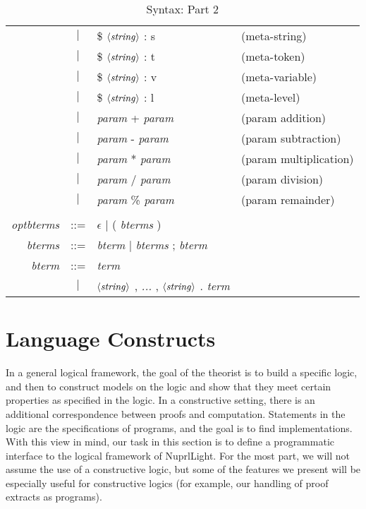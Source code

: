 \documentclass{article}
\newcommand\NuprlLight{NuprlLight}
\begin{document}
\begin{table}[ht]
\begin{center}
{\begin{tabular}{|rcll|}
            & $|$ & \$ $\left<{\it string}\right>$ \hbox{:} s & {\rm (meta-string)}\\
            & $|$ & \$ $\left<{\it string}\right>$ \hbox{:} t & {\rm (meta-token)}\\
            & $|$ & \$ $\left<{\it string}\right>$ \hbox{:} v & {\rm (meta-variable)}\\
            & $|$ & \$ $\left <{\it string}\right>$ \hbox{:} l & {\rm (meta-level)}\\
            & $|$ & {\it param} + {\it param} & {\rm (param addition)}\\
            & $|$ & {\it param} - {\it param} & {\rm (param subtraction)}\\
            & $|$ & {\it param} * {\it param} & {\rm (param multiplication)}\\
            & $|$ & {\it param} / {\it param} & {\rm (param division)}\\
            & $|$ & {\it param} \% {\it param} & {\rm (param remainder)}\\
      &&&\\
      {\it optbterms} & {\rm ::=} & \multicolumn{2}{l|}{$\epsilon$ | ( {\it bterms} )}\\
      {\it bterms} & {\rm ::=} & \multicolumn{2}{l|}{{\it bterm} | {\it bterms} ; {\it bterm}}\\
      {\it bterm} & {\rm ::=} & {\it term} &\\
            & $|$ & $\left<{\it string}\right>$ , {\it ...} , $\left<{\it string}\right>$ . {\it term} &\\
      \hline
    \end{tabular}}
\end{center}
\caption{\label{table:syntax2}Syntax: Part 2}
\end{table}

\section{Language Constructs}

In a general logical framework, the goal of the theorist is to build a specific logic, and then to
construct models on the logic and show that they meet certain properties as specified in the
logic.  In a constructive setting, there is an additional correspondence between proofs and
computation.  Statements in the logic are the specifications of programs, and the goal is to find
implementations.  With this view in mind, our task in this section is to define a programmatic
interface to the logical framework of \NuprlLight{}.  For the most part, we will not assume the use
of a constructive logic, but some of the features we present will be especially useful for
constructive logics (for example, our handling of proof extracts as programs).
\end{document}
